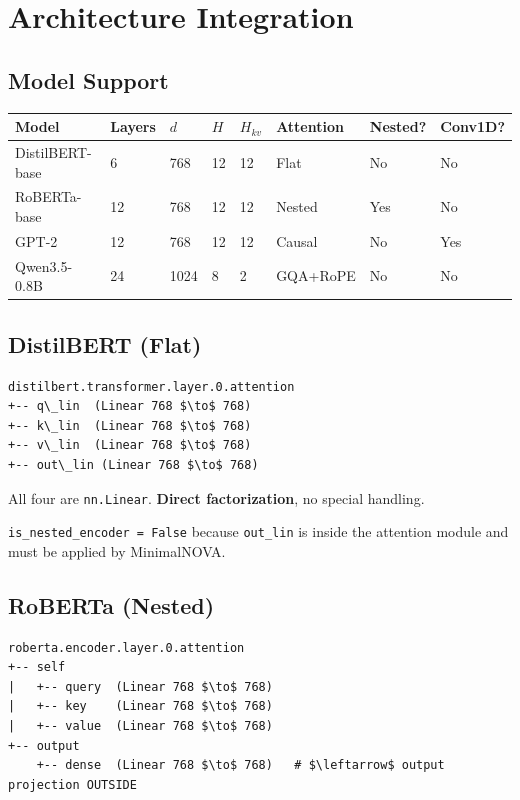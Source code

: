 
\section{Architecture Integration}

\subsection{Model Support}

\begin{table}[H]
\centering
\small
\begin{tabular}{llllllll}
\toprule
\textbf{Model} & \textbf{Layers} & \textbf{$d$} & \textbf{$H$} & \textbf{$H_{kv}$} & \textbf{Attention} & \textbf{Nested?} & \textbf{Conv1D?} \\
\midrule
DistilBERT-base & 6 & 768 & 12 & 12 & Flat & No & No \\
RoBERTa-base & 12 & 768 & 12 & 12 & Nested & Yes & No \\
GPT-2 & 12 & 768 & 12 & 12 & Causal & No & Yes \\
Qwen3.5-0.8B & 24 & 1024 & 8 & 2 & GQA+RoPE & No & No \\
\bottomrule
\end{tabular}
\end{table}

\subsection{DistilBERT (Flat)}

\begin{lstlisting}
distilbert.transformer.layer.0.attention
+-- q\_lin  (Linear 768 $\to$ 768)
+-- k\_lin  (Linear 768 $\to$ 768)
+-- v\_lin  (Linear 768 $\to$ 768)
+-- out\_lin (Linear 768 $\to$ 768)
\end{lstlisting}

All four are \texttt{nn.Linear}. \textbf{Direct factorization}, no special handling.

\texttt{is\_nested\_encoder = False} because \texttt{out\_lin} is inside the attention 
module and must be applied by MinimalNOVA.

\subsection{RoBERTa (Nested)}

\begin{lstlisting}
roberta.encoder.layer.0.attention
+-- self
|   +-- query  (Linear 768 $\to$ 768)
|   +-- key    (Linear 768 $\to$ 768)
|   +-- value  (Linear 768 $\to$ 768)
+-- output
    +-- dense  (Linear 768 $\to$ 768)   # $\leftarrow$ output projection OUTSIDE
\end{lstlisting}

